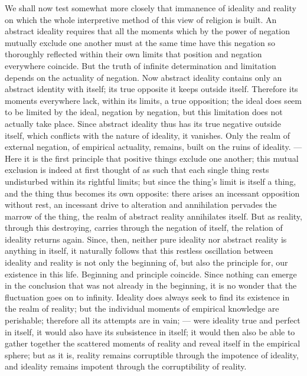 \documentclass[12pt]{book}
\newcommand{\opage}[1]{\marginnote{\footnotesize\textit{[#1]}}}
\begin{document}
We shall now test somewhat more closely that immanence of ideality and reality
on which the whole interpretive method of this view of religion is built. An
abstract ideality requires that all the moments which by the power of negation
mutually exclude one another must at the same time have this negation so
thoroughly reflected within their own limits that position and negation
everywhere coincide. But the truth of infinite determination and limitation
depends on the actuality of negation. Now abstract ideality contains only an
abstract identity with itself; its true opposite it keeps outside itself.
Therefore its moments everywhere lack, within its limits, a true opposition; the
ideal does seem to be limited by the ideal, negation by negation, but this
limitation does not actually take place. Since abstract ideality thus has its
true negative outside itself, which conflicts with the nature of ideality, it
vanishes. Only the realm of external negation, of empirical actuality, remains,
built on the ruins of ideality. --- Here it is the first principle that positive
things exclude one another; this mutual exclusion is indeed at first thought of
as such that each single thing rests undisturbed within its rightful limits;
but since the thing's limit is itself a thing, and the thing thus becomes its
own opposite: there arises an incessant opposition without rest, an incessant
\opage{139} drive to alteration and annihilation pervades the marrow of the
thing, the realm of abstract reality annihilates itself. But as reality, through
this destroying, carries through the negation of itself, the relation of
ideality returns again. Since, then, neither pure ideality nor abstract reality
is anything in itself, it naturally follows that this restless oscillation
between ideality and reality is not only the beginning of, but also the
principle for, our existence in this life. Beginning and principle coincide.
Since nothing can emerge in the conclusion that was not already in the
beginning, it is no wonder that the fluctuation goes on to infinity. Ideality
does always seek to find its existence in the realm of reality; but the
individual moments of empirical knowledge are perishable; therefore all its
attempts are in vain; --- were ideality true and perfect in itself, it would
also have its subsistence in itself; it would then also be able to gather
together the scattered moments of reality and reveal itself in the empirical
sphere; but as it is, reality remains corruptible through the impotence of
ideality, and ideality remains impotent through the corruptibility of reality.
\end{document}
